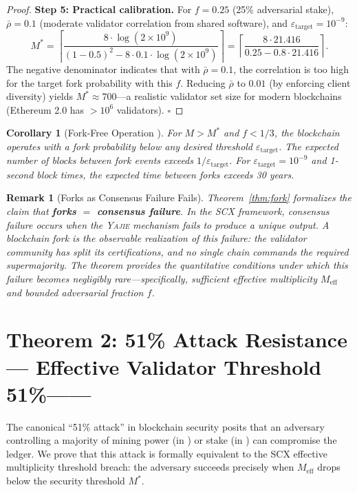 \documentclass[11pt,a4paper]{article}
\newtheorem{corollary}[theorem]{Corollary}
\newtheorem{remark}[theorem]{Remark}
\theoremstyle{definition}
\newcommand{\Yajie}{\textsc{Yajie}}
\newcommand{\SCX}{\textsc{SCX}}
\newcommand{\mthreshold}{M^{*}}
\newcommand{\PoW}{\mathrm{PoW}}
\newcommand{\PoS}{\mathrm{PoS}}
\begin{document}
\begin{proof}
\textbf{Step 5: Practical calibration.} For $f = 0.25$ (25\% adversarial stake), $\bar{\rho} = 0.1$ (moderate validator correlation from shared software), and $\varepsilon_{\mathrm{target}} = 10^{-9}$:
\begin{equation}
    \mthreshold = \left\lceil \frac{8 \cdot \log(2 \times 10^9)}{(1 - 0.5)^2 - 8 \cdot 0.1 \cdot \log(2 \times 10^9)} \right\rceil
    = \left\lceil \frac{8 \cdot 21.416}{0.25 - 0.8 \cdot 21.416} \right\rceil.
    \label{eq:fork_calibration}
\end{equation}
The negative denominator indicates that with $\bar{\rho} = 0.1$, the correlation is too high for the target fork probability with this $f$. Reducing $\bar{\rho}$ to $0.01$ (by enforcing client diversity) yields $\mthreshold \approx 700$—a realistic validator set size for modern \PoS{} blockchains (Ethereum 2.0 has $>10^6$ validators). $\square$
\end{proof}
\begin{corollary}[Fork-Free Operation ]
\label{cor:fork_free}
For $M > \mthreshold$ and $f < 1/3$, the blockchain operates with a fork probability below any desired threshold $\varepsilon_{\mathrm{target}}$. The expected number of blocks between fork events exceeds $1/\varepsilon_{\mathrm{target}}$. For $\varepsilon_{\mathrm{target}} = 10^{-9}$ and 1-second block times, the expected time between forks exceeds 30 years.
\end{corollary}
\begin{remark}[Forks as Consensus Failure Fails]
\label{rem:fork_consensus_failure}
Theorem~\ref{thm:fork} formalizes the claim that \textbf{forks $=$ consensus failure}. In the \SCX{} framework, consensus failure occurs when the \Yajie{} mechanism fails to produce a unique output. A blockchain fork is the observable realization of this failure: the validator community has split its certifications, and no single chain commands the required supermajority. The theorem provides the quantitative conditions under which this failure becomes negligibly rare—specifically, sufficient effective multiplicity $M_{\mathrm{eff}}$ and bounded adversarial fraction $f$.
\end{remark}
\section{Theorem 2: 51\% Attack Resistance — Effective Validator Threshold 51\%——}
\label{sec:fiftyone}
The canonical ``51\% attack'' in blockchain security posits that an adversary controlling a majority of mining power (in \PoW{}) or stake (in \PoS{}) can compromise the ledger. We prove that this attack is formally equivalent to the \SCX{} effective multiplicity threshold breach: the adversary succeeds precisely when $M_{\mathrm{eff}}$ drops below the security threshold $\mthreshold$.
\end{document}
